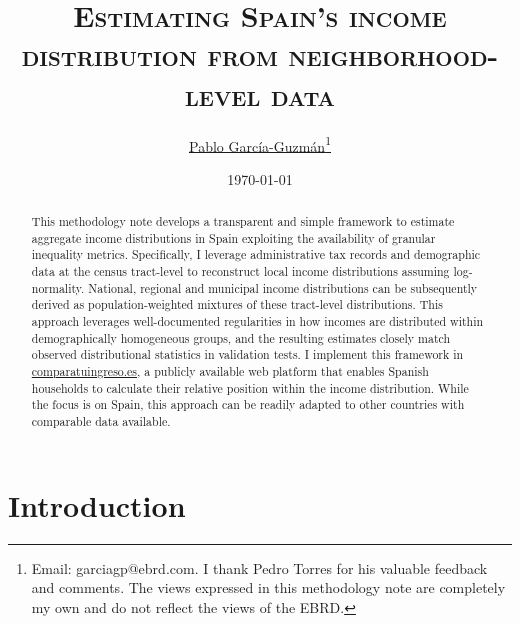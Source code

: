 \documentclass[letterpaper,11pt,leqno]{article}
\begin{document}
\title{\Large \textsc{Estimating Spain's income distribution from neighborhood-level data}}

\author{\href{https://pablogguz.github.io/}{\large{Pablo García-Guzmán}\thanks{Email: \href{mailto:pablo.garcia-guzman@ebrd.com}{garciagp@ebrd.com}. I thank Pedro Torres for his valuable feedback and comments. The views expressed in this methodology note are completely my own and do not reflect the views of the EBRD.}} \\ \normalsize{}}

\date{\normalsize \today \\}


\maketitle
\begin{abstract}
\onehalfspacing
This methodology note develops a transparent and simple framework to estimate aggregate income distributions in Spain exploiting the availability of granular inequality metrics. Specifically, I leverage administrative tax records and demographic data at the census tract-level to reconstruct local income distributions assuming log-normality. National, regional and municipal income distributions can be subsequently derived as population-weighted mixtures of these tract-level distributions. This approach leverages well-documented regularities in how incomes are distributed within demographically homogeneous groups, and the resulting estimates closely match observed distributional statistics in validation tests. I implement this framework in \href{https://comparatuingreso.es/}{comparatuingreso.es}, a publicly available web platform that enables Spanish households to calculate their relative position within the income distribution. While the focus is on Spain, this approach can be readily adapted to other countries with comparable data available.
\end{abstract}

\thispagestyle{empty}

\newpage

\setcounter{page}{1}

\section{Introduction}
\end{document}
